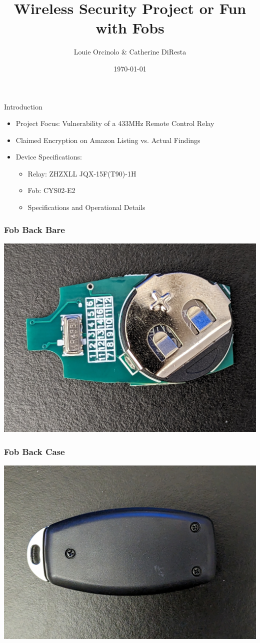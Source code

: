 \documentclass{beamer}
\title{Wireless Security Project or Fun with Fobs}
\author{Louie Orcinolo \& Catherine DiResta}
\date{\today}
\begin{document}
\frame{\titlepage}

\begin{frame}{Introduction}
    \begin{itemize}
        \item Project Focus: Vulnerability of a 433MHz Remote Control Relay
        \item Claimed Encryption on Amazon Listing vs. Actual Findings
        \item Device Specifications:
            \begin{itemize}
                \item Relay: ZHZXLL JQX-15F(T90)-1H
                \item Fob: CYS02-E2
                \item Specifications and Operational Details
            \end{itemize}
    \end{itemize}
\end{frame}

\begin{frame}
\frametitle{Fob Back Bare}
\includegraphics[width=\textwidth]{../Pics/device/fob_back_bare.jpg}
\end{frame}

\begin{frame}
\frametitle{Fob Back Case}
\includegraphics[width=\textwidth]{../Pics/device/fob_back_case.jpg}
\end{frame}
\end{document}
